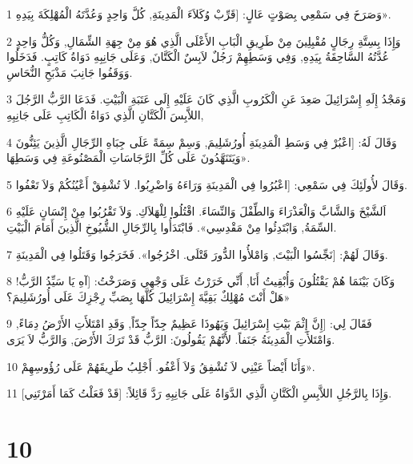 \par 1 وَصَرَخَ فِي سَمْعِي بِصَوْتٍ عَالٍ: [قَرِّبْ وُكَلاَءَ الْمَدِينَةِ, كُلَّ وَاحِدٍ وَعُدَّتَهُ الْمُهْلِكَةَ بِيَدِهِ».
\par 2 وَإِذَا بِسِتَّةِ رِجَالٍ مُقْبِلِينَ مِنْ طَرِيقِ الْبَابِ الأَعْلَى الَّذِي هُوَ مِنْ جِهَةِ الشِّمَالِ, وَكُلُّ وَاحِدٍ عُدَّتُهُ السَّاحِقَةُ بِيَدِهِ, وَفِي وَسَطِهِمْ رَجُلٌ لاَبِسٌ الْكَتَّانَ, وَعَلَى جَانِبِهِ دَوَاةُ كَاتِبٍ. فَدَخَلُوا وَوَقَفُوا جَانِبَ مَذْبَحِ النُّحَاسِ.
\par 3 وَمَجْدُ إِلَهِ إِسْرَائِيلَ صَعِدَ عَنِ الْكَرُوبِ الَّذِي كَانَ عَلَيْهِ إِلَى عَتَبَةِ الْبَيْتِ. فَدَعَا الرَّبُّ الرَّجُلَ اللاَّبِسَ الْكَتَّانِ الَّذِي دَوَاةُ الْكَاتِبِ عَلَى جَانِبِهِ,
\par 4 وَقَالَ لَهُ: [اعْبُرْ فِي وَسَطِ الْمَدِينَةِ أُورُشَلِيمَ, وَسِمْ سِمَةً عَلَى جِبَاهِ الرِّجَالِ الَّذِينَ يَئِنُّونَ وَيَتَنَهَّدُونَ عَلَى كُلِّ الرَّجَاسَاتِ الْمَصْنُوعَةِ فِي وَسَطِهَا».
\par 5 وَقَالَ لأُولَئِكَ فِي سَمْعِي: [اعْبُرُوا فِي الْمَدِينَةِ وَرَاءَهُ وَاضْرِبُوا. لاَ تُشْفِقْ أَعْيُنُكُمْ وَلاَ تَعْفُوا.
\par 6 اَلشَّيْخَ وَالشَّابَّ وَالْعَذْرَاءَ وَالطِّفْلَ وَالنِّسَاءَ. اقْتُلُوا لِلْهَلاَكِ. وَلاَ تَقْرُبُوا مِنْ إِنْسَانٍ عَلَيْهِ السِّمَةُ, وَابْتَدِئُوا مِنْ مَقْدِسِي». فَابْتَدَأُوا بِالرِّجَالِ الشُّيُوخِ الَّذِينَ أَمَامَ الْبَيْتِ.
\par 7 وَقَالَ لَهُمْ: [نَجِّسُوا الْبَيْتَ, وَامْلأُوا الدُّورَ قَتْلَى. اخْرُجُوا». فَخَرَجُوا وَقَتَلُوا فِي الْمَدِينَةِ.
\par 8 وَكَانَ بَيْنَمَا هُمْ يَقْتُلُونَ وَأُبْقِيتُ أَنَا, أَنِّي خَرَرْتُ عَلَى وَجْهِي وَصَرَخْتُ: [آهِ يَا سَيِّدُ الرَّبُّ! هَلْ أَنْتَ مُهْلِكٌ بَقِيَّةَ إِسْرَائِيلَ كُلَّهَا بِصَبِّ رِجْزِكَ عَلَى أُورُشَلِيمَ؟»
\par 9 فَقَالَ لِي: [إِنَّ إِثْمَ بَيْتِ إِسْرَائِيلَ وَيَهُوذَا عَظِيمٌ جِدّاً جِدّاً, وَقَدِ امْتَلأَتِ الأَرْضُ دِمَاءً, وَامْتَلأَتِ الْمَدِينَةُ جَنَفاً. لأَنَّهُمْ يَقُولُونَ: الرَّبُّ قَدْ تَرَكَ الأَرْضَ, وَالرَّبُّ لاَ يَرَى.
\par 10 وَأَنَا أَيْضاً عَيْنِي لاَ تُشْفِقُ وَلاَ أَعْفُو. أَجْلِبُ طَرِيقَهُمْ عَلَى رُؤُوسِهِمْ».
\par 11 وَإِذَا بِالرَّجُلِ اللاَّبِسِ الْكَتَّانِ الَّذِي الدَّوَاةُ عَلَى جَانِبِهِ رَدَّ قَائِلاً: [قَدْ فَعَلْتُ كَمَا أَمَرْتَنِي].

\chapter{10}

